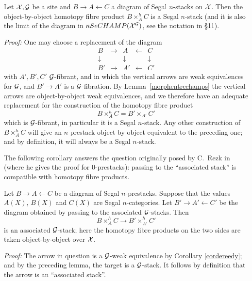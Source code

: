 \begin{lemma}
\label{fiprodchamp}
Let ${\cal X} , {\cal G}$ be a site and $B\rightarrow A\leftarrow C$ a
diagram of Segal $n$-stacks on ${\cal X}$. Then
the object-by-object homotopy fibre product $B\times ^h_AC$ is a Segal
$n$-stack (and it is also the limit of the diagram in $nSeCHAMP({\cal X} ^{{\cal G}})$,
see the
notation in \S 11).
\end{lemma}
{\em Proof:}
One may choose a replacement of the diagram
$$
\begin{array}{ccccc}
B&\rightarrow & A & \leftarrow & C \\
\downarrow && \downarrow && \downarrow \\
B'&\rightarrow & A' & \leftarrow & C'
\end{array}
$$
with $A', B', C'$ ${\cal G}$-fibrant, and in which the vertical arrows are
weak equivalences for ${\cal G}$, and $B'\rightarrow A'$ is a
${\cal G}$-fibration. By Lemma~\ref{morphentrechamps} the vertical
arrows are object-by-object weak equivalences, and we therefore have
an adequate replacement for the
construction of the homotopy fibre product
$$
B\times ^h_AC = B'\times _{A'}C'
$$
which is ${\cal G}$-fibrant, in particular it is a Segal $n$-stack. Any
other construction of $B\times ^h_AC$ will give an $n$-prestack
object-by-object equivalent to the preceding one; and by definition, it will
always be a
Segal $n$-stack.
\eop

The following corollary answers the question originally posed by C.~Rezk
in \cite{Rezk} (where he gives the proof for
$0$-prestacks): passing to the ``associated stack'' is compatible
with homotopy fibre products.

\begin{corollary}
\label{rezkQ}
Let $B\rightarrow A \leftarrow C$ be a diagram of Segal $n$-prestacks.
Suppose that
the values $A(X)$, $B(X)$ and $C(X)$ are Segal $n$-categories.
Let $B'\rightarrow A'\leftarrow C'$ be the diagram obtained by passing
to the associated ${\cal G}$-stacks. Then
$$
B\times ^h_AC\rightarrow B'\times ^h_{A'}C'
$$
is an associated ${\cal G}$-stack; here the homotopy fibre products on the two
sides are taken object-by-object over ${\cal X}$.
\end{corollary}
{\em Proof:}
The arrow in question is a ${\cal G}$-weak equivalence by Corollary
\ref{cordereedy}; and by the preceding lemma,
the target is a ${\cal G}$-stack. It
follows by definition that the arrow is an ``associated stack''.
\eop

